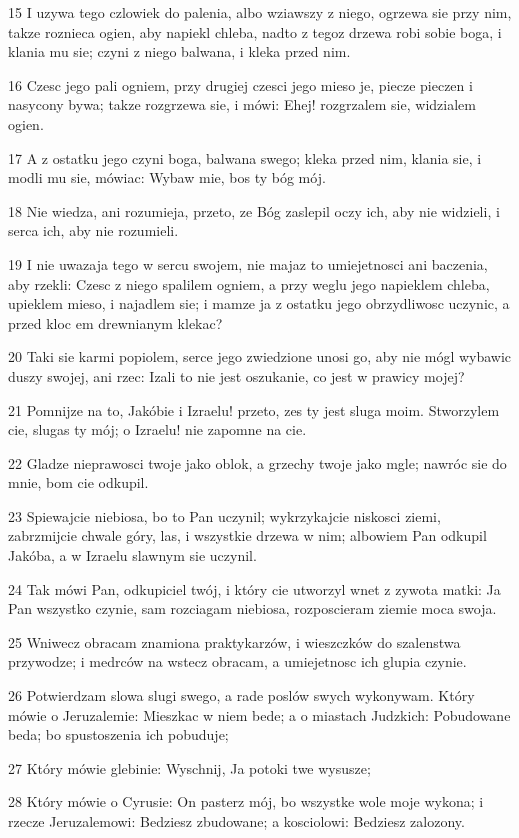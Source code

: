 \par 15 I uzywa tego czlowiek do palenia, albo wziawszy z niego, ogrzewa sie przy nim, takze roznieca ogien, aby napiekl chleba, nadto z tegoz drzewa robi sobie boga, i klania mu sie; czyni z niego balwana, i kleka przed nim.
\par 16 Czesc jego pali ogniem, przy drugiej czesci jego mieso je, piecze pieczen i nasycony bywa; takze rozgrzewa sie, i mówi: Ehej! rozgrzalem sie, widzialem ogien.
\par 17 A z ostatku jego czyni boga, balwana swego; kleka przed nim, klania sie, i modli mu sie, mówiac: Wybaw mie, bos ty bóg mój.
\par 18 Nie wiedza, ani rozumieja, przeto, ze Bóg zaslepil oczy ich, aby nie widzieli, i serca ich, aby nie rozumieli.
\par 19 I nie uwazaja tego w sercu swojem, nie majaz to umiejetnosci ani baczenia, aby rzekli: Czesc z niego spalilem ogniem, a przy weglu jego napieklem chleba, upieklem mieso, i najadlem sie; i mamze ja z ostatku jego obrzydliwosc uczynic, a przed kloc em drewnianym klekac?
\par 20 Taki sie karmi popiolem, serce jego zwiedzione unosi go, aby nie mógl wybawic duszy swojej, ani rzec: Izali to nie jest oszukanie, co jest w prawicy mojej?
\par 21 Pomnijze na to, Jakóbie i Izraelu! przeto, zes ty jest sluga moim. Stworzylem cie, slugas ty mój; o Izraelu! nie zapomne na cie.
\par 22 Gladze nieprawosci twoje jako oblok, a grzechy twoje jako mgle; nawróc sie do mnie, bom cie odkupil.
\par 23 Spiewajcie niebiosa, bo to Pan uczynil; wykrzykajcie niskosci ziemi, zabrzmijcie chwale góry, las, i wszystkie drzewa w nim; albowiem Pan odkupil Jakóba, a w Izraelu slawnym sie uczynil.
\par 24 Tak mówi Pan, odkupiciel twój, i który cie utworzyl wnet z zywota matki: Ja Pan wszystko czynie, sam rozciagam niebiosa, rozposcieram ziemie moca swoja.
\par 25 Wniwecz obracam znamiona praktykarzów, i wieszczków do szalenstwa przywodze; i medrców na wstecz obracam, a umiejetnosc ich glupia czynie.
\par 26 Potwierdzam slowa slugi swego, a rade poslów swych wykonywam. Który mówie o Jeruzalemie: Mieszkac w niem bede; a o miastach Judzkich: Pobudowane beda; bo spustoszenia ich pobuduje;
\par 27 Który mówie glebinie: Wyschnij, Ja potoki twe wysusze;
\par 28 Który mówie o Cyrusie: On pasterz mój, bo wszystke wole moje wykona; i rzecze Jeruzalemowi: Bedziesz zbudowane; a kosciolowi: Bedziesz zalozony.

